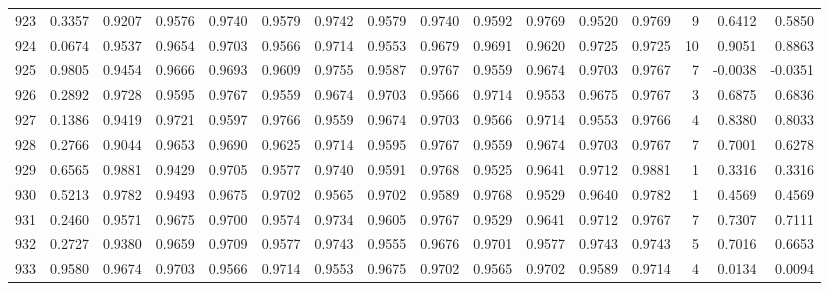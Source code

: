 \begin{tabular}{lrrrrrrrrrrrrrrr}
923 &      0.3357 &  0.9207 &  0.9576 &  0.9740 &  0.9579 &  0.9742 &  0.9579 &  0.9740 &  0.9592 &  0.9769 &   0.9520 &     0.9769 &      9 &                    0.6412 &                     0.5850 \\
924 &      0.0674 &  0.9537 &  0.9654 &  0.9703 &  0.9566 &  0.9714 &  0.9553 &  0.9679 &  0.9691 &  0.9620 &   0.9725 &     0.9725 &     10 &                    0.9051 &                     0.8863 \\
925 &      0.9805 &  0.9454 &  0.9666 &  0.9693 &  0.9609 &  0.9755 &  0.9587 &  0.9767 &  0.9559 &  0.9674 &   0.9703 &     0.9767 &      7 &                   -0.0038 &                    -0.0351 \\
926 &      0.2892 &  0.9728 &  0.9595 &  0.9767 &  0.9559 &  0.9674 &  0.9703 &  0.9566 &  0.9714 &  0.9553 &   0.9675 &     0.9767 &      3 &                    0.6875 &                     0.6836 \\
927 &      0.1386 &  0.9419 &  0.9721 &  0.9597 &  0.9766 &  0.9559 &  0.9674 &  0.9703 &  0.9566 &  0.9714 &   0.9553 &     0.9766 &      4 &                    0.8380 &                     0.8033 \\
928 &      0.2766 &  0.9044 &  0.9653 &  0.9690 &  0.9625 &  0.9714 &  0.9595 &  0.9767 &  0.9559 &  0.9674 &   0.9703 &     0.9767 &      7 &                    0.7001 &                     0.6278 \\
929 &      0.6565 &  0.9881 &  0.9429 &  0.9705 &  0.9577 &  0.9740 &  0.9591 &  0.9768 &  0.9525 &  0.9641 &   0.9712 &     0.9881 &      1 &                    0.3316 &                     0.3316 \\
930 &      0.5213 &  0.9782 &  0.9493 &  0.9675 &  0.9702 &  0.9565 &  0.9702 &  0.9589 &  0.9768 &  0.9529 &   0.9640 &     0.9782 &      1 &                    0.4569 &                     0.4569 \\
931 &      0.2460 &  0.9571 &  0.9675 &  0.9700 &  0.9574 &  0.9734 &  0.9605 &  0.9767 &  0.9529 &  0.9641 &   0.9712 &     0.9767 &      7 &                    0.7307 &                     0.7111 \\
932 &      0.2727 &  0.9380 &  0.9659 &  0.9709 &  0.9577 &  0.9743 &  0.9555 &  0.9676 &  0.9701 &  0.9577 &   0.9743 &     0.9743 &      5 &                    0.7016 &                     0.6653 \\
933 &      0.9580 &  0.9674 &  0.9703 &  0.9566 &  0.9714 &  0.9553 &  0.9675 &  0.9702 &  0.9565 &  0.9702 &   0.9589 &     0.9714 &      4 &                    0.0134 &                     0.0094 \\

\end{tabular}
